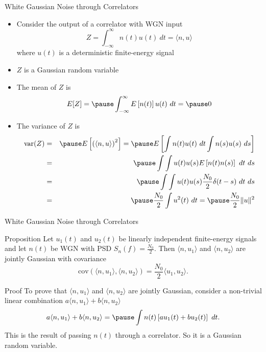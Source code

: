 \documentclass[t]{beamer}
\begin{document}
\begin{frame}{White Gaussian Noise through Correlators}
  \footnotesize
  \begin{itemize}
    \pause
    \item Consider the output of a correlator with WGN input
      \begin{equation*}
        Z = \int_{-\infty}^{\infty} n(t) u(t) \ dt = \langle n, u\rangle
      \end{equation*}
      where $u(t)$ is a deterministic finite-energy signal
    \pause
    \item $Z$ is a Gaussian random variable
    \pause
    \item The mean of $Z$ is
      \pause
      \begin{equation*}
        E[Z] = \pause \int_{-\infty}^{\infty} E\left[n(t)\right] u(t) \ dt = \pause 0
      \end{equation*}
    \pause
    \item The variance of $Z$ is \pause
      \begin{eqnarray*}
        \text{var}(Z) & = & \pause E\left[ \left(\langle n, u \rangle \right)^2 \right]  = \pause E \left[ \int n(t) u(t) \ dt \int n(s) u(s) \ ds \right] \\
        & = & \pause \int \int u(t) u(s) E\left[ n(t) n(s) \right] \ dt \ ds \\
        & = & \pause \int \int u(t) u(s) \frac{N_0}{2} \delta(t-s) \ dt \ ds \\
        & = & \pause \frac{N_0}{2} \int u^2(t) \ dt = \pause \frac{N_0}{2} \lVert u \rVert^2
      \end{eqnarray*}
  \end{itemize}
  \normalsize
\end{frame}

\begin{frame}{White Gaussian Noise through Correlators}
  \footnotesize
  \begin{block}{Proposition}
  Let $u_1(t)$ and $u_2(t)$ be linearly independent finite-energy signals and let $n(t)$ be WGN with PSD $S_n(f) = \frac{N_0}{2}$. \pause Then $\langle n, u_1 \rangle$ and $\langle n, u_2 \rangle$ are jointly Gaussian with covariance \pause
      \begin{equation*}
        \text{cov}\left( \langle n, u_1 \rangle, \langle n, u_2 \rangle \right) = \frac{N_0}{2} \langle u_1, u_2 \rangle.
      \end{equation*}
  \end{block}
  \pause
  \begin{block}{Proof}
     To prove that $\langle n, u_1 \rangle$ and $\langle n, u_2 \rangle$ are jointly Gaussian, consider a non-trivial linear combination $a\langle n, u_1 \rangle + b\langle n, u_2 \rangle$ 
      \begin{equation*}
        a\langle n, u_1 \rangle +b \langle n, u_2 \rangle  = \pause \int n(t) \left[au_1(t) + bu_2(t)\right] \ dt.
      \end{equation*}
    \pause This is the result of passing $n(t)$ through a correlator. So it is a Gaussian random variable.
  \end{block}
  \normalsize
\end{frame}
\end{document}
